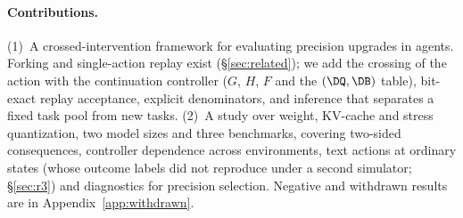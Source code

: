 \paragraph{Contributions.} (1)~A crossed-intervention framework for evaluating precision upgrades in agents. Forking and single-action replay exist (\S\ref{sec:related}); we add the crossing of the action with the continuation controller ($G$, $H$, $F$ and the $(\DQ,\DB)$ table), bit-exact replay acceptance, explicit denominators, and inference that separates a fixed task pool from new tasks. (2)~A study over weight, KV-cache and stress quantization, two model sizes and three benchmarks, covering two-sided consequences, controller dependence across environments, text actions at ordinary states (whose outcome labels did not reproduce under a second simulator; \S\ref{sec:r3}) and diagnostics for precision selection. Negative and withdrawn results are in Appendix~\ref{app:withdrawn}. %

